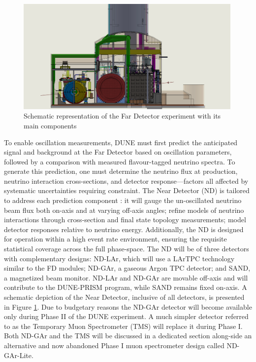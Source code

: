 \begin{figure}[!h]
     \centering
     \includegraphics[width=0.99\textwidth]{figures/ch3-DUNE/ndhall.JPG}
     \caption{Schematic representation of the Far Detector experiment with its main components}
        \label{fig:NDhall}
\end{figure}

To enable oscillation measurements, DUNE must first predict the anticipated signal and background at the Far Detector based on oscillation parameters, followed by a comparison with measured flavour-tagged neutrino spectra. To generate this prediction, one must determine the neutrino flux at production, neutrino interaction cross-sections, and detector response—factors all affected by systematic uncertainties requiring constraint. The Near Detector (ND) is tailored to address each prediction component \cite{DUNE:2021NDCDR}: it will gauge the un-oscillated neutrino beam flux both on-axis and at varying off-axis angles; refine models of neutrino interactions through cross-section and final state topology measurements; model detector responses relative to neutrino energy. Additionally, the ND is designed for operation within a high event rate environment, ensuring the requisite statistical coverage across the full phase-space. The ND will be of three detectors with complementary designs: ND-LAr, which will use a LArTPC technology similar to the FD modules; ND-GAr, a gaseous Argon TPC detector; and SAND, a magnetized beam monitor. ND-LAr and ND-GAr are movable off-axis and will contribute to the DUNE-PRISM program, while SAND remains fixed on-axis. A schematic depiction of the Near Detector, inclusive of all detectors, is presented in Figure \ref{fig:NDhall}. Due to budgetary reasons the ND-GAr detector will become available only during Phase II of the DUNE experiment. A much simpler detector referred to as the Temporary Muon Spectrometer (TMS) will replace it during Phase I. Both ND-GAr and the TMS will be discussed in a dedicated section along-side an alternative and now abandoned Phase I muon spectrometer design called ND-GAr-Lite. 


